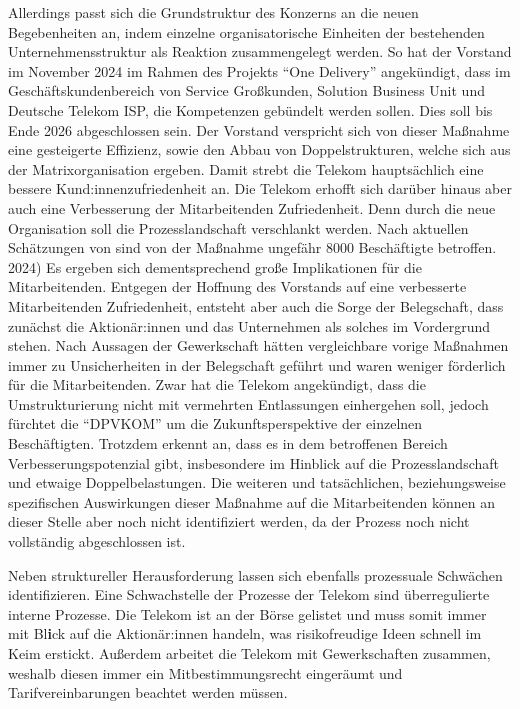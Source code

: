\documentclass[12pt,a4paper]{article}
\newcommand{\zitat}[1]{\parencite{#1}}
\begin{document}
	\noindent Allerdings passt sich die Grundstruktur des Konzerns an die neuen
	Begebenheiten an, indem einzelne organisatorische Einheiten der
	bestehenden Unternehmensstruktur als Reaktion zusammengelegt werden. So
	hat der Vorstand im November 2024 im Rahmen des Projekts ``One
	Delivery'' angekündigt, dass im Geschäftskundenbereich von Service
	Großkunden, Solution Business Unit und Deutsche Telekom ISP, die
	Kompetenzen gebündelt werden sollen. Dies soll bis Ende 2026
	abgeschlossen sein. Der Vorstand verspricht sich von dieser Maßnahme
	eine gesteigerte Effizienz, sowie den Abbau von Doppelstrukturen, welche
	sich aus der Matrixorganisation ergeben. Damit strebt die Telekom
	\noindent hauptsächlich eine bessere Kund:innenzufriedenheit an. \zitat{dpvkom2025onedelivery} 
	\noindent Die Telekom erhofft sich darüber hinaus aber auch eine Verbesserung der
	Mitarbeitenden Zufriedenheit. Denn durch die neue Organisation soll die
	Prozesslandschaft verschlankt werden. Nach aktuellen Schätzungen von
	\zitat{verdi2025} sind von der Maßnahme ungefähr 8000
	Beschäftigte betroffen. \zitat{verdi2025}
	2024) Es ergeben sich dementsprechend große Implikationen für die
	Mitarbeitenden. Entgegen der Hoffnung des Vorstands auf eine verbesserte
	Mitarbeitenden Zufriedenheit, entsteht aber auch die Sorge der
	Belegschaft, dass zunächst die Aktionär:innen und das Unternehmen als
	solches im Vordergrund stehen. Nach Aussagen der Gewerkschaft hätten
	vergleichbare vorige Maßnahmen immer zu Unsicherheiten in der
	Belegschaft geführt und waren weniger förderlich für die Mitarbeitenden.
	Zwar hat die Telekom angekündigt, dass die Umstrukturierung nicht mit
	vermehrten Entlassungen einhergehen soll, jedoch fürchtet die ``DPVKOM''
	um die Zukunftsperspektive der einzelnen Beschäftigten. Trotzdem erkennt
	\zitat{verdi2025} an, dass es in dem betroffenen
	Bereich Verbesserungspotenzial gibt, insbesondere im Hinblick auf die
	Prozesslandschaft und etwaige Doppelbelastungen.
	\zitat{verdi2025} Die weiteren und
	tatsächlichen, beziehungsweise spezifischen Auswirkungen dieser Maßnahme
	auf die Mitarbeitenden können an dieser Stelle aber noch nicht
	identifiziert werden, da der Prozess noch nicht vollständig
	abgeschlossen ist.
	
	\noindent Neben struktureller Herausforderung lassen sich ebenfalls prozessuale
	Schwächen identifizieren. Eine Schwachstelle der Prozesse der Telekom
	sind überregulierte interne Prozesse. Die Telekom ist an der Börse
	gelistet und muss somit immer mit Bl\textbf{i}ck auf die Aktionär:innen
	handeln, was risikofreudige Ideen schnell im Keim erstickt. Außerdem
	arbeitet die Telekom mit Gewerkschaften zusammen, weshalb diesen immer
	ein Mitbestimmungsrecht eingeräumt und Tarifvereinbarungen beachtet
	werden müssen.
	
\end{document}
